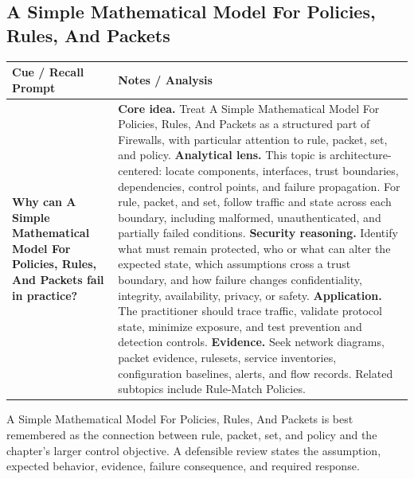 \documentclass[11pt]{article}
\newcommand{\CornellHeader}{%
\rowcolor{Navy}\color{white}\bfseries Cue / Recall Prompt & \color{white}\bfseries Notes / Analysis\\\hline}
\newcommand{\CornellRow}[2]{%
\cellcolor{CueGray}\RaggedRight\textbf{#1} & \RaggedRight #2\\\hline}
\begin{document}
\subsection*{A Simple Mathematical Model For Policies, Rules, And Packets}
\begin{longtable}{>{\RaggedRight\arraybackslash}p{}|>{\RaggedRight\arraybackslash}p{}}
\CornellHeader
\CornellRow{Why can A Simple Mathematical Model For Policies, Rules, And Packets fail in practice?}{\textbf{Core idea.} Treat A Simple Mathematical Model For Policies, Rules, And Packets as a structured part of Firewalls, with particular attention to rule, packet, set, and policy. \textbf{Analytical lens.} This topic is architecture-centered: locate components, interfaces, trust boundaries, dependencies, control points, and failure propagation. For rule, packet, and set, follow traffic and state across each boundary, including malformed, unauthenticated, and partially failed conditions. \textbf{Security reasoning.} Identify what must remain protected, who or what can alter the expected state, which assumptions cross a trust boundary, and how failure changes confidentiality, integrity, availability, privacy, or safety. \textbf{Application.} The practitioner should trace traffic, validate protocol state, minimize exposure, and test prevention and detection controls. \textbf{Evidence.} Seek network diagrams, packet evidence, rulesets, service inventories, configuration baselines, alerts, and flow records. Related subtopics include Rule-Match Policies.}
\end{longtable}
\begin{topicsummary}
A Simple Mathematical Model For Policies, Rules, And Packets is best remembered as the connection between rule, packet, set, and policy and the chapter's larger control objective. A defensible review states the assumption, expected behavior, evidence, failure consequence, and required response.
\end{topicsummary}
\end{document}
